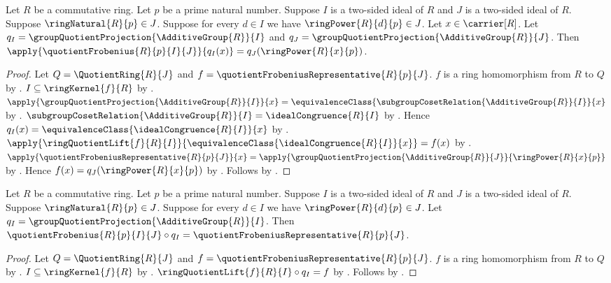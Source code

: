 \begin{proposition}\label{quotient_frobenius_apply}
    Let $R$ be a commutative ring.
    Let $p$ be a prime natural number.
    Suppose $I$ is a two-sided ideal of $R$ and
        $J$ is a two-sided ideal of $R$.
    Suppose $\ringNatural{R}{p}\in J$.
    Suppose for every $d\in I$ we have
        $\ringPower{R}{d}{p}\in J$.
    Let $x\in\carrier[R]$.
    Let $q_I=\groupQuotientProjection{\AdditiveGroup{R}}{I}$ and
        $q_J=\groupQuotientProjection{\AdditiveGroup{R}}{J}$.
    Then
        $\apply{\quotientFrobenius{R}{p}{I}{J}}{q_I(x)}
        =q_J(\ringPower{R}{x}{p})$.
\end{proposition}
\begin{proof}
    Let $Q=\QuotientRing{R}{J}$ and
        $f=\quotientFrobeniusRepresentative{R}{p}{J}$.
    $f$ is a ring homomorphism from $R$ to $Q$ by
        .
    $I\subseteq\ringKernel{f}{R}$ by
        .
    $\apply{\groupQuotientProjection{\AdditiveGroup{R}}{I}}{x}
        =\equivalenceClass{
            \subgroupCosetRelation{\AdditiveGroup{R}}{I}}{x}$ by
        .
    $\subgroupCosetRelation{\AdditiveGroup{R}}{I}
        =\idealCongruence{R}{I}$ by .
    Hence $q_I(x)=\equivalenceClass{\idealCongruence{R}{I}}{x}$ by
        \auto.
    $\apply{\ringQuotientLift{f}{R}{I}}{
        \equivalenceClass{\idealCongruence{R}{I}}{x}}=f(x)$ by
        .
    $\apply{\quotientFrobeniusRepresentative{R}{p}{J}}{x}
        =\apply{\groupQuotientProjection{\AdditiveGroup{R}}{J}}{
            \ringPower{R}{x}{p}}$ by
        .
    Hence $f(x)=q_J(\ringPower{R}{x}{p})$ by \auto.
    Follows by .
\end{proof}

\begin{theorem}\label{quotient_frobenius_factorization}
    Let $R$ be a commutative ring.
    Let $p$ be a prime natural number.
    Suppose $I$ is a two-sided ideal of $R$ and
        $J$ is a two-sided ideal of $R$.
    Suppose $\ringNatural{R}{p}\in J$.
    Suppose for every $d\in I$ we have
        $\ringPower{R}{d}{p}\in J$.
    Let $q_I=\groupQuotientProjection{\AdditiveGroup{R}}{I}$.
    Then
        $\quotientFrobenius{R}{p}{I}{J}\circ q_I
            =\quotientFrobeniusRepresentative{R}{p}{J}$.
\end{theorem}
\begin{proof}
    Let $Q=\QuotientRing{R}{J}$ and
        $f=\quotientFrobeniusRepresentative{R}{p}{J}$.
    $f$ is a ring homomorphism from $R$ to $Q$ by
        .
    $I\subseteq\ringKernel{f}{R}$ by
        .
    $\ringQuotientLift{f}{R}{I}\circ q_I=f$ by
        .
    Follows by .
\end{proof}

